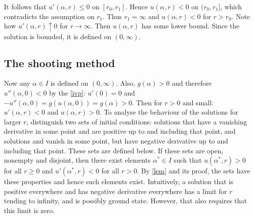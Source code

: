 It follows that $u'(\alpha,r)\leq0$ on $[r_0,r_1]$. Hence $u(\alpha,r)<0$ on $(r_0,r_1]$, which contradicts the assumption on $r_1$. Thus $r_1=\infty$ and $u(\alpha,r)<0$ for $r>r_0$. Note how $u'(\alpha,r)\uparrow0$ for $r\to\infty$. Then $u(\alpha,r)$ has some lower bound. Since the solution is bounded, it is defined on $(0,\infty)$.

\subsection{The shooting method}\hfill

Now any $\alpha\in I$ is defined on $(0,\infty)$. Also, $g(\alpha)>0$ and therefore $u''(\alpha,0)<0$ by the \eqref{ivp}: $u'(0)=0$ and $-u''(\alpha,0)=g(u(\alpha,0))=g(\alpha)>0$. Then for $r>0$ and small: $u'(\alpha,r)<0$ and $u(\alpha,r)>0$. To analyse the behaviour of the solutions for larger $r$, distinguish two sets of initial conditions: solutions that have a vanishing derivative in some point and are positive up to and including that point, and solutions and vanish in some point, but have negative derivative up to and including that point. {\color{red}These sets are defined below.} If these sets are open, nonempty and disjoint, then there exist elements $\alpha^*\in I$ such that $u(\alpha^*,r)>0$ for all $r\geq0$ and $u'(\alpha^*,r)<0$ for all $r>0$. By \cref{lem} and its proof, the sets have these properties and hence such elements exist. Intuitively, a solution that is positive everywhere and has negative derivative everywhere has a limit for $r$ tending to infinity, and is possibly ground state. However, that also requires that this limit is zero.

